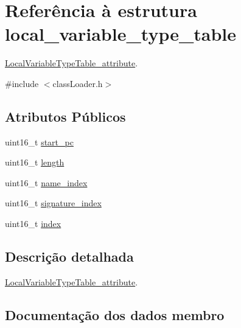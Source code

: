 \hypertarget{structlocal__variable__type__table}{}\section{Referência à estrutura local\+\_\+variable\+\_\+type\+\_\+table}
\label{structlocal__variable__type__table}


\hyperlink{struct_local_variable_type_table__attribute}{Local\+Variable\+Type\+Table\+\_\+attribute}.  




{\ttfamily \#include $<$class\+Loader.\+h$>$}

\subsection*{Atributos Públicos}
\begin{DoxyCompactItemize}
\item 
uint16\+\_\+t \hyperlink{structlocal__variable__type__table_a60409ae355abc4acfa5d6f6eeb1e5a32}{start\+\_\+pc}
\item 
uint16\+\_\+t \hyperlink{structlocal__variable__type__table_ab4aec28dc62a86426d882d71fb7301c4}{length}
\item 
uint16\+\_\+t \hyperlink{structlocal__variable__type__table_a85f7a2f12d9aef19590f878ee17503d9}{name\+\_\+index}
\item 
uint16\+\_\+t \hyperlink{structlocal__variable__type__table_ae61ca0c68c0bd6aed2698eb51da60b17}{signature\+\_\+index}
\item 
uint16\+\_\+t \hyperlink{structlocal__variable__type__table_a1b306d3867ffc4ae4b5deda1c6303d0c}{index}
\end{DoxyCompactItemize}


\subsection{Descrição detalhada}
\hyperlink{struct_local_variable_type_table__attribute}{Local\+Variable\+Type\+Table\+\_\+attribute}. 

\subsection{Documentação dos dados membro}
\hypertarget{structlocal__variable__type__table_a1b306d3867ffc4ae4b5deda1c6303d0c}{}\label{structlocal__variable__type__table_a1b306d3867ffc4ae4b5deda1c6303d0c} 
